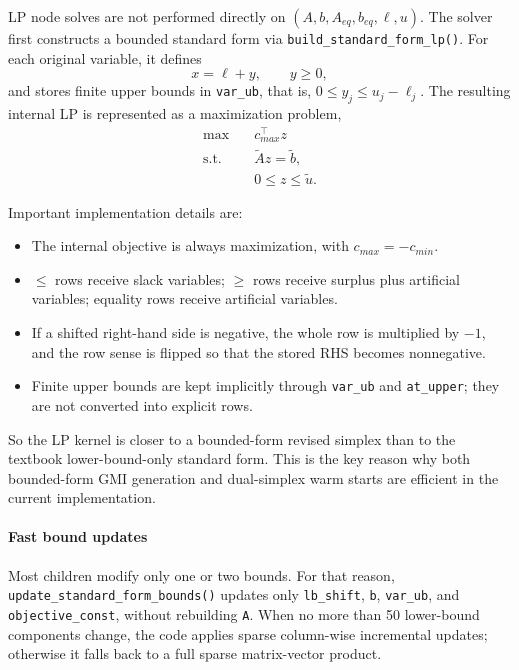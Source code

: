 LP node solves are not performed directly on
\((A,b,A_{eq},b_{eq},\ell,u)\). The solver first constructs a bounded standard form via \texttt{build\_standard\_form\_lp()}.
For each original variable, it defines
\begin{equation}
  x = \ell + y, \qquad y \ge 0,
\end{equation}
and stores finite upper bounds in \texttt{var\_ub}, that is,
\(0 \le y_j \le u_j-\ell_j\).
The resulting internal LP is represented as a maximization problem,
\begin{align}
  \max \quad & c_{max}^\top z \\
  \text{s.t.}\quad & \widetilde A z = \widetilde b, \\
                    & 0 \le z \le \widetilde u.
\end{align}

Important implementation details are:
\begin{itemize}
  \item The internal objective is always maximization, with \(c_{max}=-c_{min}\).
  \item \(\le\) rows receive slack variables; \(\ge\) rows receive surplus plus artificial variables; equality rows receive artificial variables.
  \item If a shifted right-hand side is negative, the whole row is multiplied by \(-1\), and the row sense is flipped so that the stored RHS becomes nonnegative.
  \item Finite upper bounds are kept implicitly through \texttt{var\_ub} and \texttt{at\_upper}; they are not converted into explicit rows.
\end{itemize}

So the LP kernel is closer to a bounded-form revised simplex than to the textbook lower-bound-only standard form. This is the key reason why both bounded-form GMI generation and dual-simplex warm starts are efficient in the current implementation.

\paragraph{Fast bound updates}
Most children modify only one or two bounds. For that reason,
\texttt{update\_standard\_form\_bounds()} updates only
\texttt{lb\_shift}, \texttt{b}, \texttt{var\_ub}, and \texttt{objective\_const}, without rebuilding \texttt{A}. When no more than 50 lower-bound components change, the code applies sparse column-wise incremental updates; otherwise it falls back to a full sparse matrix-vector product.

